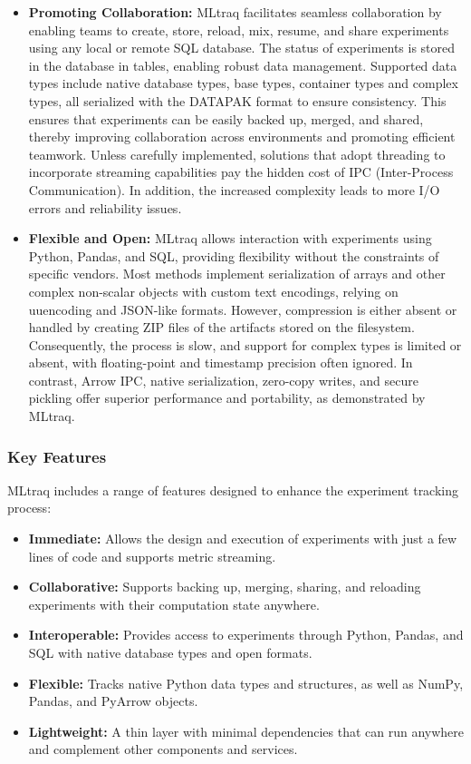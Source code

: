 \begin{itemize}
    \item \textbf{Promoting Collaboration:} MLtraq facilitates seamless collaboration by enabling teams to create, store, reload, mix, resume, and share experiments using any local or remote SQL database. The status of experiments is stored in the database in tables, enabling robust data management. Supported data types include native database types, base types, container types and complex types, all serialized with the DATAPAK format to ensure consistency. This ensures that experiments can be easily backed up, merged, and shared, thereby improving collaboration across environments and promoting efficient teamwork. Unless carefully implemented, solutions that adopt threading to incorporate streaming capabilities pay the hidden cost of IPC (Inter-Process Communication). In addition, the increased complexity leads to more I/O errors and reliability issues.
    \item \textbf{Flexible and Open:} MLtraq allows interaction with experiments using Python, Pandas, and SQL, providing flexibility without the constraints of specific vendors. Most methods implement serialization of arrays and other complex non-scalar objects with custom text encodings, relying on uuencoding and JSON-like formats. However, compression is either absent or handled by creating ZIP files of the artifacts stored on the filesystem. Consequently, the process is slow, and support for complex types is limited or absent, with floating-point and timestamp precision often ignored. In contrast, Arrow IPC, native serialization, zero-copy writes, and secure pickling offer superior performance and portability, as demonstrated by MLtraq. \cite{mltraq2024}
\end{itemize}

\subsubsection{Key Features}

MLtraq includes a range of features designed to enhance the experiment tracking process:

\begin{itemize}
    \item \textbf{Immediate:} Allows the design and execution of experiments with just a few lines of code and supports metric streaming.
    \item \textbf{Collaborative:} Supports backing up, merging, sharing, and reloading experiments with their computation state anywhere.
    \item \textbf{Interoperable:} Provides access to experiments through Python, Pandas, and SQL with native database types and open formats.
    \item \textbf{Flexible:} Tracks native Python data types and structures, as well as NumPy, Pandas, and PyArrow objects.
    \item \textbf{Lightweight:} A thin layer with minimal dependencies that can run anywhere and complement other components and services.
\end{itemize}

